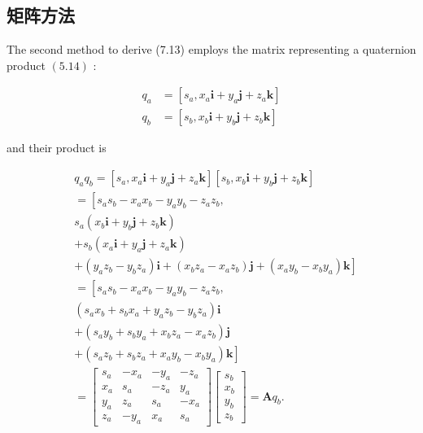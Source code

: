 \subsection{矩阵方法}
The second method to derive (7.13) employs the matrix representing a quaternion product $(5.14)$ :

$$
\begin{aligned}
q_{a} & =\left[s_{a}, x_{a} \mathbf{i}+y_{a} \mathbf{j}+z_{a} \mathbf{k}\right] \\
q_{b} & =\left[s_{b}, x_{b} \mathbf{i}+y_{b} \mathbf{j}+z_{b} \mathbf{k}\right]
\end{aligned}
$$

and their product is

$$
\begin{aligned}
& q_{a} q_{b}=\left[s_{a}, x_{a} \mathbf{i}+y_{a} \mathbf{j}+z_{a} \mathbf{k}\right]\left[s_{b}, x_{b} \mathbf{i}+y_{b} \mathbf{j}+z_{b} \mathbf{k}\right] \\
& =\left[s_{a} s_{b}-x_{a} x_{b}-y_{a} y_{b}-z_{a} z_{b},\right. \\
& s_{a}\left(x_{b} \mathbf{i}+y_{b} \mathbf{j}+z_{b} \mathbf{k}\right) \\
& +s_{b}\left(x_{a} \mathbf{i}+y_{a} \mathbf{j}+z_{a} \mathbf{k}\right) \\
& \left.+\left(y_{a} z_{b}-y_{b} z_{a}\right) \mathbf{i}+\left(x_{b} z_{a}-x_{a} z_{b}\right) \mathbf{j}+\left(x_{a} y_{b}-x_{b} y_{a}\right) \mathbf{k}\right] \\
& =\left[s_{a} s_{b}-x_{a} x_{b}-y_{a} y_{b}-z_{a} z_{b}\right. \text {, } \\
& \left(s_{a} x_{b}+s_{b} x_{a}+y_{a} z_{b}-y_{b} z_{a}\right) \mathbf{i} \\
& +\left(s_{a} y_{b}+s_{b} y_{a}+x_{b} z_{a}-x_{a} z_{b}\right) \mathbf{j} \\
& \left.+\left(s_{a} z_{b}+s_{b} z_{a}+x_{a} y_{b}-x_{b} y_{a}\right) \mathbf{k}\right] \\
& =\left[\begin{array}{cccc}s_{a} & -x_{a} & -y_{a} & -z_{a} \\x_{a} & s_{a} & -z_{a} & y_{a} \\y_{a} & z_{a} & s_{a} & -x_{a} \\z_{a} & -y_{a} & x_{a} & s_{a}\end{array}\right]\left[\begin{array}{c}s_{b} \\x_{b} \\y_{b} \\z_{b}\end{array}\right]=\mathbf{A} q_{b} .
\end{aligned}
$$


